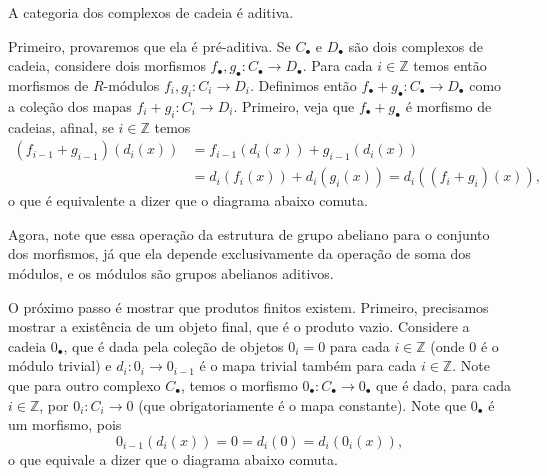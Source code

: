 \begin{lema}
    A categoria dos complexos de cadeia é aditiva.
\end{lema}
\begin{demolema}
    Primeiro, provaremos que ela é pré-aditiva. Se $C_\bullet$ e $D_\bullet$ são dois complexos de cadeia, considere dois morfismos $f_\bullet, g_\bullet \colon C_\bullet \to D_\bullet$. Para cada $i \in \mathbb{Z}$ temos então morfismos de $R$-módulos $f_i, g_i \colon C_i \to D_i$. Definimos então $f_\bullet + g_\bullet \colon C_\bullet \to D_\bullet$ como a coleção dos mapas $f_i + g_i \colon C_i \to D_i$. Primeiro, veja que $f_\bullet + g_\bullet$ é morfismo de cadeias, afinal, se $i \in \mathbb{Z}$ temos \begin{align}
        (f_{i - 1} + g_{i - 1})(d_i(x)) &= f_{i -1}(d_i(x)) + g_{i - 1}(d_i(x)) \\ &= d_i(f_i(x)) + d_i(g_i(x)) = d_i((f_i + g_i)(x)),
    \end{align} o que é equivalente a dizer que o diagrama abaixo comuta.

    \begin{center}
    \end{center}

    Agora, note que essa operação da estrutura de grupo abeliano para o conjunto dos morfismos, já que ela depende exclusivamente da operação de soma dos módulos, e os módulos são grupos abelianos aditivos.

    O próximo passo é mostrar que produtos finitos existem. Primeiro, precisamos mostrar a existência de um objeto final, que é o produto vazio. Considere a cadeia $0_\bullet$, que é dada pela coleção de objetos $0_i = 0$ para cada $i \in \mathbb{Z}$ (onde $0$ é o módulo trivial) e $d_i \colon 0_i \to 0_{i - 1}$ é o mapa trivial também para cada $i \in \mathbb{Z}$. Note que para outro complexo $C_\bullet$, temos o morfismo $0_\bullet \colon C_\bullet \to 0_\bullet$ que é dado, para cada $i \in \mathbb{Z}$, por $0_i \colon C_i \to 0$ (que obrigatoriamente é o mapa constante). Note que $0_\bullet$ é um morfismo, pois \begin{equation}
        0_{i - 1}(d_i(x)) = 0 = d_i(0) = d_i(0_i(x)),
    \end{equation} o que equivale a dizer que o diagrama abaixo comuta.


\end{demolema}
